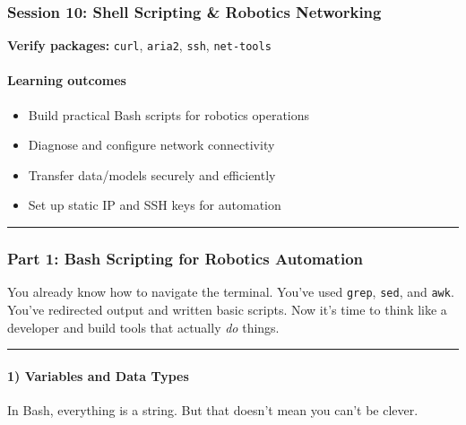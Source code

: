 \documentclass[
  english,
  paper=a4,
  oneside  ,captions=tableheading
]{scrartcl}
\providecommand{\tightlist}{%
  \setlength{\itemsep}{0pt}\setlength{\parskip}{0pt}}
\renewenvironment{quote}{\begin{customblockquote}\list{}{\rightmargin=0em\leftmargin=0em}%
\item\relax\color{blockquote-text}\ignorespaces}{\unskip\unskip\endlist\end{customblockquote}}
\begin{document}
\subsubsection{Session 10: Shell Scripting \& Robotics
Networking}\label{session-10-shell-scripting-robotics-networking}

\begin{quote}
\textbf{Verify packages:} \texttt{curl}, \texttt{aria2}, \texttt{ssh},
\texttt{net-tools}
\end{quote}

\paragraph{Learning outcomes}\label{learning-outcomes-9}

\begin{itemize}
\tightlist
\item
  Build practical Bash scripts for robotics operations
\item
  Diagnose and configure network connectivity
\item
  Transfer data/models securely and efficiently
\item
  Set up static IP and SSH keys for automation
\end{itemize}

\begin{center}\rule{0.5\linewidth}{0.5pt}\end{center}

\subsubsection{Part 1: Bash Scripting for Robotics
Automation}\label{part-1-bash-scripting-for-robotics-automation}

You already know how to navigate the terminal. You've used
\texttt{grep}, \texttt{sed}, and \texttt{awk}. You've redirected output
and written basic scripts. Now it's time to think like a developer and
build tools that actually \emph{do} things.

\begin{center}\rule{0.5\linewidth}{0.5pt}\end{center}

\paragraph{1) Variables and Data Types}\label{variables-and-data-types}

In Bash, everything is a string. But that doesn't mean you can't be
clever.
\end{document}
